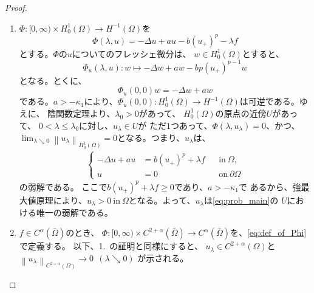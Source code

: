 \begin{proof}
 \begin{enumerate}[1.]
  \item $\Phi \colon [0,\infty) \times H^1_0 (\Omega) \to H^{-1}(\Omega)$を
        \begin{equation}
         \Phi (\lambda, u) = -\Delta u + au - b (u_{+})^p - \lambda f
          \label{eq:def_of_Phi}
        \end{equation}
        とする。$\Phi$の$u$についてのフレッシェ微分は、
        $w \in H^1_0(\Omega)$とすると、
        \[
         \Phi_u (\lambda, u) \colon w \mapsto -\Delta w + aw - b p(u_+)^{p-1} w
        \]
        となる。とくに、
        \[
         \Phi_u (0, 0) w = -\Delta w + aw 
        \]
        である。$a > -\kappa_1$により、$\Phi_u(0,0) \colon
        H^1_0(\Omega) \to H^{-1} (\Omega)$は可逆である。ゆえに、
        陰関数定理より、$\lambda_0 > 0$があって、
        $H_0^1(\Omega)$の原点の近傍$U$があって、
        $0 < \lambda \leq \lambda_0$に対し、$u_\lambda \in U$が
        ただ$1$つあって、$\Phi(\lambda, u_\lambda) = 0$、かつ、
        $\lim_{\lambda \searrow 0} \left\| u_\lambda \right\|_{H^1_0(\Omega)} =
        0$となる。つまり、$u_\lambda$は、
        \begin{align}
         \left\{
         \begin{aligned}
           -\Delta u + a u &= b (u_+)^p + \lambda f  & &\text{in}~ \Omega,  \\
           u &= 0 & &\text{on}~ \partial\Omega
         \end{aligned}
         \right. \label{eq:prob_lem_ifthm}
        \end{align}
        の弱解である。
        ここで$b (u_+)^p + \lambda f \geq 0$であり、$a > -\kappa_1$で
        あるから、強最大値原理により、$u_\lambda > 0 ~\text{in}~
        \Omega$となる。よって、$u_\lambda$は\ref{eq:prob_main}の
        $U$における唯一の弱解である。
  \item $f \in C^\alpha(\bar{\Omega})$のとき、
        $\Phi \colon [0,\infty) \times C^{2+\alpha} (\bar{\Omega})
        \to C^\alpha(\bar{\Omega})$を、\eqref{eq:def_of_Phi}で定義する。
        以下、1.~の証明と同様にすると、
        $u_\lambda \in
        C^{2+\alpha}(\Omega)$と
        $\left\| u_\lambda
        \right\|_{C^{2+\alpha}(\Omega)} \to 0 \ \ (\lambda \searrow
        0)$
        が示される。\qedhere
 \end{enumerate}
\end{proof}